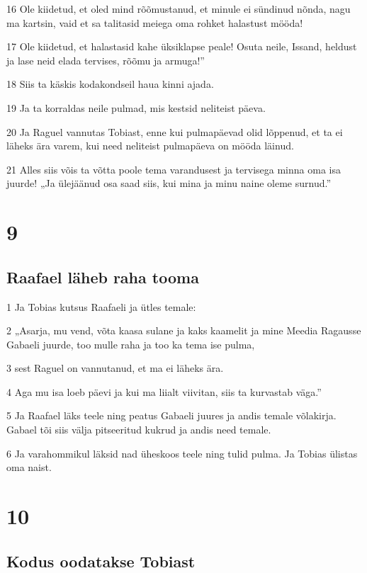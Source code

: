 \par 16 Ole kiidetud, et oled mind rõõmustanud, et minule ei sündinud  nõnda, nagu ma kartsin, vaid et sa talitasid meiega oma rohket halastust  mööda!
\par 17 Ole kiidetud, et halastasid kahe üksiklapse peale! Osuta neile,  Issand, heldust ja lase neid elada tervises, rõõmu ja armuga!”
\par 18 Siis ta käskis kodakondseil haua kinni ajada.
\par 19 Ja ta korraldas neile pulmad, mis kestsid neliteist  päeva.
\par 20 Ja Raguel vannutas Tobiast, enne kui pulmapäevad olid lõppenud,  et ta ei läheks ära varem, kui need neliteist pulmapäeva on mööda  läinud.
\par 21 Alles siis võis ta võtta poole tema varandusest ja tervisega  minna oma isa juurde! „Ja ülejäänud osa saad siis, kui mina ja minu naine  oleme surnud.”

\chapter{9}

\section*{Raafael läheb raha tooma}

\par 1 Ja Tobias kutsus Raafaeli ja ütles temale:
\par 2 „Asarja, mu vend, võta kaasa sulane ja kaks kaamelit ja mine  Meedia Ragausse Gabaeli juurde, too mulle raha ja too ka tema ise  pulma,
\par 3 sest Raguel on vannutanud, et ma ei läheks ära.
\par 4 Aga mu isa loeb päevi ja kui ma liialt viivitan, siis ta kurvastab  väga.”
\par 5 Ja Raafael läks teele ning peatus Gabaeli juures ja andis temale  võlakirja. Gabael tõi siis välja pitseeritud kukrud ja andis need  temale.
\par 6 Ja varahommikul läksid nad üheskoos teele ning tulid pulma. Ja  Tobias ülistas oma naist.

\chapter{10}

\section*{Kodus oodatakse Tobiast}

